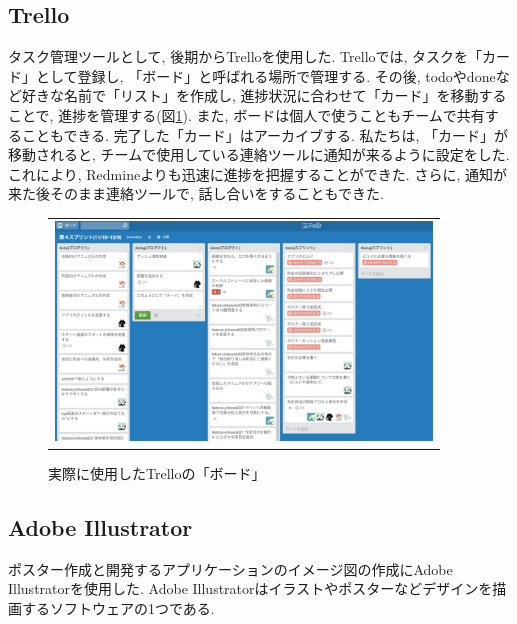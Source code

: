 \subsection{Trello}%
タスク管理ツールとして, 後期からTrelloを使用した. Trelloでは, タスクを「カード」として登録し, 「ボード」と呼ばれる場所で管理する\cite{Trello}. その後, todoやdoneなど好きな名前で「リスト」を作成し, 進捗状況に合わせて「カード」を移動することで, 進捗を管理する\cite{Trello}(図\ref{fig:image_trello}). また, ボードは個人で使うこともチームで共有することもできる\cite{Trello}. 完了した「カード」はアーカイブする. 私たちは, 「カード」が移動されると, チームで使用している連絡ツールに通知が来るように設定をした. これにより, Redmineよりも迅速に進捗を把握することができた. さらに, 通知が来た後そのまま連絡ツールで, 話し合いをすることもできた.
\begin{figure}[htbp]
  \begin{center}
    \begin{tabular}{c}

      \begin{minipage}{0.7\hsize}
        \begin{center}
\includegraphics[width=10cm]{about_trello.png}
          \hspace{1cm} %
        \end{center}
      \end{minipage}

    \end{tabular}
    \caption{実際に使用したTrelloの「ボード」}
    \label{fig:image_trello}
  \end{center}
\end{figure}

\subsection{Adobe Illustrator}%
ポスター作成と開発するアプリケーションのイメージ図の作成にAdobe Illustratorを使用した. Adobe Illustratorはイラストやポスターなどデザインを描画するソフトウェアの1つである.

